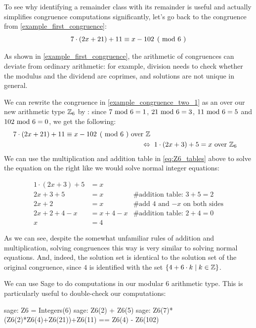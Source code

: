 \begin{example} 
To see why identifying a remainder class with its remainder is useful and actually simplifies congruence computations significantly, let's go back to the congruence from \examplename{} \ref{example_first_congruence}:
\begin{equation}
\label{example_congruence_two_1}
\kongru{7\cdot(2x+21) + 11}{x-102}{6}
\end{equation}

As shown in \examplename{} \ref{example_first_congruence}, the arithmetic of congruences can deviate from ordinary arithmetic: for example, division needs to check whether the modulus and the dividend are coprimes, and solutions are not unique in general.

We can rewrite the congruence  in \eqref{example_congruence_two_1} as an  over our new arithmetic type $\mathbb{Z}_6$ by : since $7 \text{ mod } 6= 1$, $21 \text{ mod } 6= 3$, $11 \text{ mod } 6= 5$ and $102 \text{ mod } 6= 0$, we get the following:
\begin{align*}
\kongru{7\cdot(2x+21) + 11}{x-102}{6} \text{ over } \Z\\
\Leftrightarrow & \; \; 1\cdot (2x+3) + 5 = x \text{ over } \Z_6
\end{align*}
We can use the multiplication and addition table in \eqref{eq:Z6_tables} above to solve the equation on the right like we would solve normal integer equations:

\begin{align*}
1\cdot (2x+3) + 5 &= x & \text{ }\\
2x+3 + 5 &= x & \text{\# addition table: } 3+5 = 2 \\
2x+2 &= x & \text{\# add 4 and $-x$ on both sides} \\
2x+2 +4 -x &= x + 4 -x & \text{\# addition  table: } 2+4 = 0 \\
x &= 4 &
\end{align*}

As we can see, despite the somewhat unfamiliar rules of addition and multiplication, solving congruences this way is very similar to solving normal equations. And, indeed, the solution set is identical to the solution set of the original congruence, since $4$ is identified with the set $\{4+6\cdot k\;|\; k\in\mathbb{Z}\}$.

We can use  Sage to do computations in our modular $6$ arithmetic type. This is particularly useful to double-check our computations:
\begin{sagecommandline}
sage: Z6 = Integers(6)
sage: Z6(2) + Z6(5)
sage: Z6(7)*(Z6(2)*Z6(4)+Z6(21))+Z6(11) == Z6(4) - Z6(102)
\end{sagecommandline}
\end{example}

